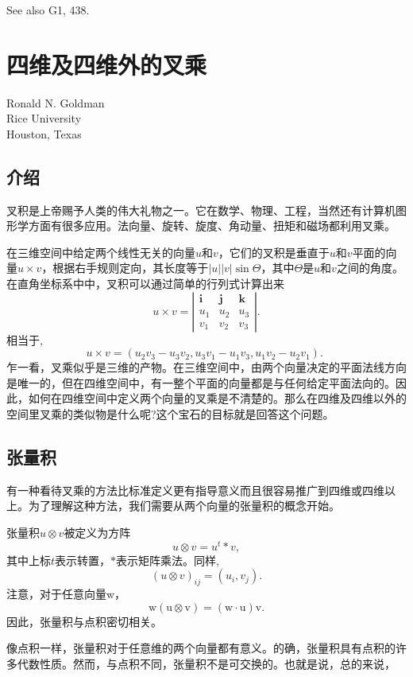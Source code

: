 \begin{CJK}{UTF8}{gbsn}
See also G1, 438.

\newpage
\section{四维及四维外的叉乘}
\begin{center}
\small{
Ronald N. Goldman\\
Rice University\\
Houston, Texas}
\end{center}

\subsection*{介绍}
叉积是上帝赐予人类的伟大礼物之一。它在数学、物理、工程，当然还有计算机图形学方面有很多应用。法向量、旋转、旋度、角动量、扭矩和磁场都利用叉乘。

在三维空间中给定两个线性无关的向量$u$和$v$，它们的叉积是垂直于$u$和$v$平面的向量$u \times v$，根据右手规则定向，其长度等于$|u||v| \sin \Theta$，其中$\Theta$是$u$和$v$之间的角度。在直角坐标系中中，叉积可以通过简单的行列式计算出来
$$
u \times v=\left|\begin{array}{ccc}
\mathbf{i} & \mathbf{j} & \mathbf{k} \\
u_{1} & u_{2} & u_{3} \\
v_{1} & v_{2} & v_{3}
\end{array}\right| .
$$
相当于,
$$
u \times v=\left(u_{2} v_{3}-u_{3} v_{2}, u_{3} v_{1}-u_{1} v_{3}, u_{1} v_{2}-u_{2} v_{1}\right) \text {. }
$$
乍一看，叉乘似乎是三维的产物。在三维空间中，由两个向量决定的平面法线方向是唯一的，但在四维空间中，有一整个平面的向量都是与任何给定平面法向的。因此，如何在四维空间中定义两个向量的叉乘是不清楚的。那么在四维及四维以外的空间里叉乘的类似物是什么呢?这个宝石的目标就是回答这个问题。

\subsection*{张量积}
有一种看待叉乘的方法比标准定义更有指导意义而且很容易推广到四维或四维以上。为了理解这种方法，我们需要从两个向量的张量积的概念开始。

张量积$u \otimes v$被定义为方阵
$$
u \otimes v=u^t * v,
$$
其中上标$t$表示转置，$*$表示矩阵乘法。同样,
$$
(u \otimes v)_{i j}=\left(u_{i}, v_{j}\right) .
$$
注意，对于任意向量w，
$$
\mathrm{w}(\mathrm{u} \otimes \mathrm{v})=(\mathrm{w} \cdot \mathrm{u}) \mathrm{v} .
$$
因此，张量积与点积密切相关。

像点积一样，张量积对于任意维的两个向量都有意义。的确，张量积具有点积的许多代数性质。然而，与点积不同，张量积不是可交换的。也就是说，总的来说，


\end{CJK}
